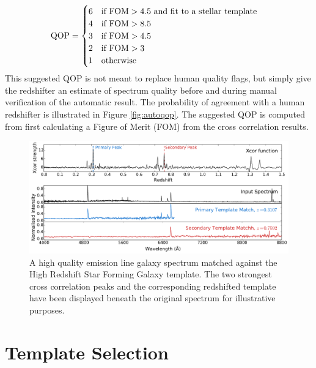 \documentclass[iop]{emulateapj}
\begin{document}
\begin{align}
{\rm QOP} &= \begin{cases}6 & \text{if } {\rm FOM} > 4.5 \text{ and fit to a stellar template} \label{eq:autoqop2}\\
4 & \text{if } {\rm FOM} > 8.5  \\
3 & \text{if } {\rm FOM} > 4.5 \\
2 & \text{if } {\rm FOM} > 3 \\
1 & \text{otherwise} \end{cases}
\end{align}
This suggested QOP is not meant to replace human quality flags, but simply give the redshifter an estimate of spectrum quality before and during manual verification of the automatic result. The probability of agreement with a human redshifter is illustrated in Figure \ref{fig:autoqop}. The suggested QOP is computed from first calculating a Figure of Merit (FOM) from the cross correlation results.







\begin{figure}[t]
\centering
\includegraphics[width=\textwidth]{xcors.pdf}
\caption{A high quality emission line galaxy spectrum matched against the High Redshift Star Forming Galaxy template. The two strongest cross correlation peaks and the corresponding redshifted template have been displayed beneath the original spectrum for illustrative purposes.}
\label{fig:xcors}
\end{figure}







\section{Template Selection}
\end{document}

